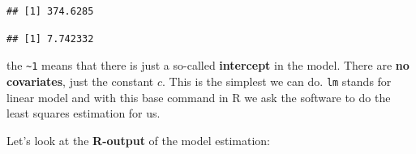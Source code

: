 \documentclass[
]{book}
\newenvironment{Shaded}{\begin{snugshade}}{\end{snugshade}}
\newcommand{\CommentTok}[1]{\textcolor[rgb]{0.56,0.35,0.01}{\textit{#1}}}
\newcommand{\DecValTok}[1]{\textcolor[rgb]{0.00,0.00,0.81}{#1}}
\newcommand{\FunctionTok}[1]{\textcolor[rgb]{0.13,0.29,0.53}{\textbf{#1}}}
\newcommand{\NormalTok}[1]{#1}
\newcommand{\SpecialCharTok}[1]{\textcolor[rgb]{0.81,0.36,0.00}{\textbf{#1}}}
\begin{document}
\begin{verbatim}
## [1] 374.6285
\end{verbatim}

\begin{Shaded}
\end{Shaded}

\begin{verbatim}
## [1] 7.742332
\end{verbatim}

the \texttt{\textasciitilde{}1} means that there is just a so-called \textbf{intercept} in the model.
There are \textbf{no covariates}, just the constant \(c\).
This is the simplest we can do. \texttt{lm} stands for linear model and with this base
command in R we ask the software to do the least squares estimation for us.

Let's look at the \textbf{R-output} of the model estimation:
\end{document}
